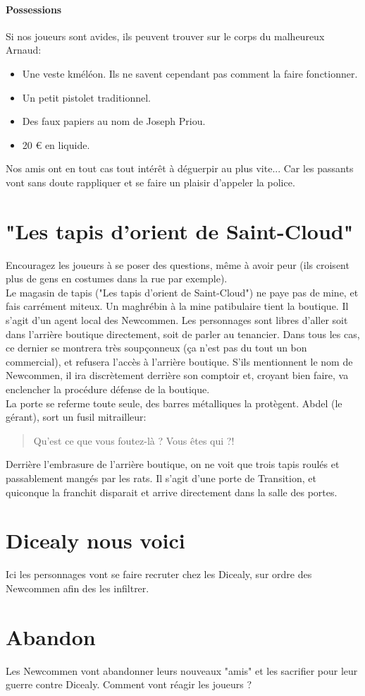 \documentclass[10pt,a4paper,twocolumn]{article}
\begin{document}
\paragraph*{Possessions}
Si nos joueurs sont avides, ils peuvent trouver sur le corps du malheureux Arnaud:
\begin{itemize}
	\item Une veste kméléon. Ils ne savent cependant pas comment la faire fonctionner.
	\item Un petit pistolet traditionnel.
	\item Des faux papiers au nom de Joseph Priou.
	\item 20 € en liquide.
\end{itemize}
Nos amis ont en tout cas tout intérêt à déguerpir au plus vite... Car les passants vont sans doute rappliquer et se faire un plaisir d'appeler la police.
\section{"Les tapis d'orient de Saint-Cloud"}
Encouragez les joueurs à se poser des questions, même à avoir peur (ils croisent plus de gens en costumes dans la rue par exemple). \\
Le magasin de tapis ("Les tapis d'orient de Saint-Cloud") ne paye pas de mine, et fais carrément miteux. Un maghrébin à la mine patibulaire tient la boutique. Il s'agit d'un agent local des Newcommen. Les personnages sont libres d'aller soit dans l'arrière boutique directement, soit de parler au tenancier. Dans tous les cas, ce dernier se montrera très soupçonneux (ça n'est pas du tout un bon commercial), et refusera l'accès à l'arrière boutique. S'ils mentionnent le nom de Newcommen, il ira discrètement derrière son comptoir et, croyant bien faire, va enclencher la procédure défense de la boutique.\\
La porte se referme toute seule, des barres métalliques la protègent. Abdel (le gérant), sort un fusil mitrailleur:
\begin{quote}
Qu'est ce que vous foutez-là ? Vous êtes qui ?!
\end{quote}

Derrière l'embrasure de l'arrière boutique, on ne voit que trois tapis roulés et passablement mangés par les rats. Il s'agit d'une porte de Transition, et quiconque la franchit disparait et arrive directement dans la salle des portes.

\section{Dicealy nous voici}
Ici les personnages vont se faire recruter chez les Dicealy, sur ordre des Newcommen afin des les infiltrer.

\section{Abandon}
Les Newcommen vont abandonner leurs nouveaux "amis" et les sacrifier pour leur guerre contre Dicealy. Comment vont réagir les joueurs ?
\end{document}
